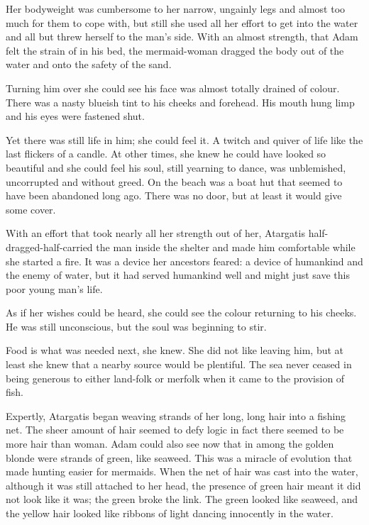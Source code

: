 Her bodyweight was cumbersome to her narrow, ungainly legs and almost
too much for them to cope with, but still she used all her effort to
get into the water and all but threw herself to the man’s side. With
an almost strength, that Adam felt the strain of in his bed, the
mermaid-woman dragged the body out of the water and onto the safety of
the sand.

Turning him over she could see his face was almost totally drained of
colour. There was a nasty blueish tint to his cheeks and forehead. His
mouth hung limp and his eyes were fastened shut.

Yet there was still life in him; she could feel it. A twitch and
quiver of life like the last flickers of a candle. At other times, she
knew he could have looked so beautiful and she could feel his soul,
still yearning to dance, was unblemished, uncorrupted and without
greed.  On the beach was a boat hut that seemed to have been abandoned
long ago. There was no door, but at least it would give some cover.

With an effort that took nearly all her strength out of her, Atargatis
half-dragged-half-carried the man inside the shelter and made him
comfortable while she started a fire. It was a device her ancestors
feared: a device of humankind and the enemy of water, but it had
served humankind well and might just save this poor young man’s life.

As if her wishes could be heard, she could see the colour returning to
his cheeks. He was still unconscious, but the soul was beginning to
stir.

Food is what was needed next, she knew. She did not like leaving him,
but at least she knew that a nearby source would be plentiful. The sea
never ceased in being generous to either land-folk or merfolk when it
came to the provision of fish.

Expertly, Atargatis began weaving strands of her long, long hair into
a fishing net. The sheer amount of hair seemed to defy logic in fact
there seemed to be more hair than woman. Adam could also see now that
in among the golden blonde were strands of green, like seaweed. This
was a miracle of evolution that made hunting easier for mermaids. When
the net of hair was cast into the water, although it was still
attached to her head, the presence of green hair meant it did not look
like it was; the green broke the link. The green looked like seaweed,
and the yellow hair looked like ribbons of light dancing innocently in
the water.

